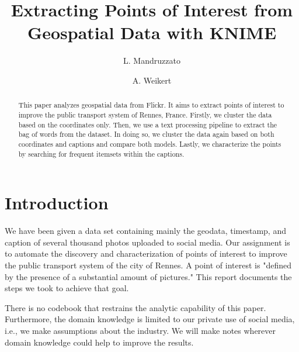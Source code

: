 \documentclass[runningheads]{llncs}
\begin{document}
%
\title{Extracting Points of Interest from Geospatial Data with KNIME}
%
%
\author{L. Mandruzzato \and
A. Weikert}
%
%
%
\maketitle              %
%
\begin{abstract}
This paper analyzes geospatial data from Flickr. It aims to extract points of interest to improve the public transport system of Rennes, France. Firstly, we cluster the data based on the coordinates only. Then, we use a text processing pipeline to extract the bag of words from the dataset. In doing so, we cluster the data again based on both coordinates and captions and compare both models. Lastly, we characterize the points by searching for frequent itemsets within the captions.

\end{abstract}
%
%
%
\section{Introduction}\label{intro}
We have been given a data set containing mainly the geodata, timestamp, and caption of several thousand photos uploaded to social media. Our assignment is to automate the discovery and characterization of points of interest to improve the public transport system of the city of Rennes. A point of interest is "defined by the presence of a substantial amount of pictures." This report documents the steps we took to achieve that goal.

There is no codebook that restrains the analytic capability of this paper. Furthermore, the domain knowledge is limited to our private use of social media, i.e., we make assumptions about the industry. We will make notes wherever domain knowledge could help to improve the results.
\end{document}
